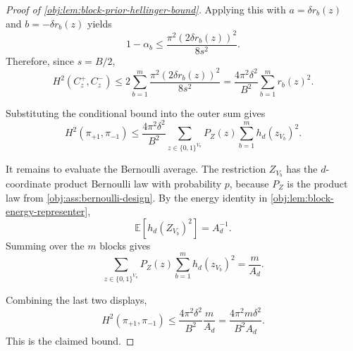 \begin{proof}[Proof of \cref{obj:lem:block-prior-hellinger-bound}]
Applying this with \(a=\delta r_b(z)\) and \(b=-\delta r_b(z)\) yields
\[
1-\alpha_b
\le
\frac{\pi^2(2\delta r_b(z))^2}{8s^2}.
\]
Therefore, since \(s=B/2\),
\[
H^2(C_z^+,C_z^-)
\le
2\sum_{b=1}^{m}
\frac{\pi^2(2\delta r_b(z))^2}{8s^2}
=
\frac{4\pi^2\delta^2}{B^2}
\sum_{b=1}^{m} r_b(z)^2 .
\]

Substituting the conditional bound into the outer sum gives
\[
H^2(\pi_{+1},\pi_{-1})
\le
\frac{4\pi^2\delta^2}{B^2}
\sum_{z\in\{0,1\}^{V_n}}P_Z(z)
\sum_{b=1}^{m}h_d(z_{V_b})^2 .
\]

It remains to evaluate the Bernoulli average.  The restriction \(Z_{V_b}\) has the \(d\)-coordinate product Bernoulli law with probability \(p\), because \(P_Z\) is the product law from \cref{obj:ass:bernoulli-design}.  By the energy identity in \cref{obj:lem:block-energy-representer},
\[
\mathbb E\!\left[h_d(Z_{V_b})^2\right]=A_d^{-1}.
\]
Summing over the \(m\) blocks gives
\[
\sum_{z\in\{0,1\}^{V_n}}P_Z(z)
\sum_{b=1}^{m}h_d(z_{V_b})^2
=
\frac{m}{A_d}.
\]

Combining the last two displays,
\[
H^2(\pi_{+1},\pi_{-1})
\le
\frac{4\pi^2\delta^2}{B^2}\frac{m}{A_d}
=
\frac{4\pi^2m\delta^2}{B^2A_d}.
\]
This is the claimed bound. %
\end{proof}
